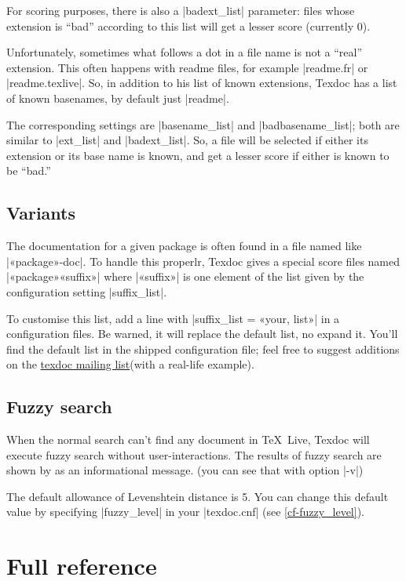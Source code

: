 \documentclass[a4paper, oneside]{scrartcl}
\newcommand\texlive{\TeX~Live\xspace}
\newcommand\tdml{\href{http://lists.tug.org/texdoc}{texdoc mailing list}\xspace}
\begin{document}
For scoring purposes, there is also a |badext_list| parameter: files whose
extension is ``bad'' according to this list will get a lesser score (currently
0).

Unfortunately, sometimes what follows a dot in a file name is not a ``real''
extension. This often happens with readme files, for example |readme.fr| or
|readme.texlive|. So, in addition to his list of known extensions, Texdoc has
a list of known basenames, by default just |readme|.

The corresponding settings are |basename_list| and |badbasename_list|; both
are similar to |ext_list| and |badext_list|. So, a file will be selected if
either its extension or its base name is known, and get a lesser score if
either is known to be ``bad.''

\subsection{Variants}\label{ss-variants}

The documentation for a given package is often found in a file named like
|«package»-doc|. To handle this properlr, Texdoc gives a special score files
named |«package»«suffix»| where |«suffix»| is one element of the list given by
the configuration setting |suffix_list|.

To customise this list, add a line with |suffix_list = «your, list»| in a
configuration files. Be warned, it will replace the default list, no expand
it. You'll find the default list in the shipped configuration file; feel free
to suggest additions on the \tdml (with a real-life example).

\subsection{Fuzzy search}\label{ss-fuzzy}

When the normal search can't find any document in \texlive, Texdoc will execute
fuzzy search without user-interactions. The results of fuzzy search are shown
by as an informational message. (you can see that with option |-v|)

The default allowance of Levenshtein distance is 5. You can change this
default value by specifying |fuzzy_level| in your |texdoc.cnf| (see
\ref{cf-fuzzy_level}).

\clearpage

\section{Full reference}
\end{document}
